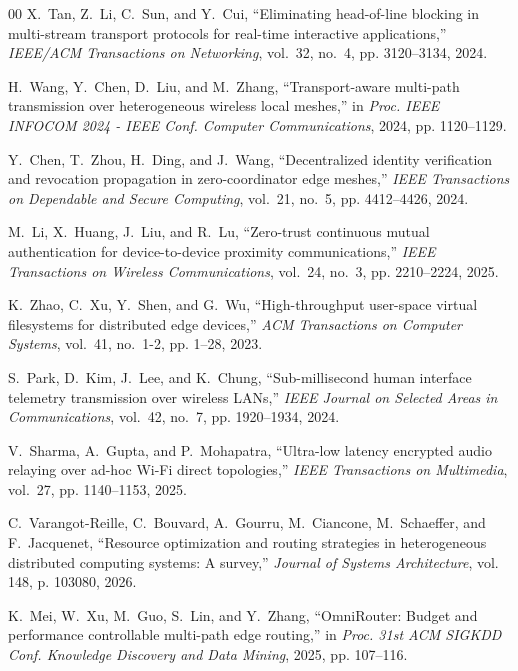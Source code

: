 \documentclass[conference]{IEEEtran}
\begin{document}
\begin{thebibliography}{00}
X.~Tan, Z.~Li, C.~Sun, and Y.~Cui, ``Eliminating head-of-line blocking in multi-stream transport protocols for real-time interactive applications,'' \emph{IEEE/ACM Transactions on Networking}, vol.~32, no.~4, pp. 3120--3134, 2024.

H.~Wang, Y.~Chen, D.~Liu, and M.~Zhang, ``Transport-aware multi-path transmission over heterogeneous wireless local meshes,'' in \emph{Proc. IEEE INFOCOM 2024 - IEEE Conf. Computer Communications}, 2024, pp. 1120--1129.

Y.~Chen, T.~Zhou, H.~Ding, and J.~Wang, ``Decentralized identity verification and revocation propagation in zero-coordinator edge meshes,'' \emph{IEEE Transactions on Dependable and Secure Computing}, vol.~21, no.~5, pp. 4412--4426, 2024.

M.~Li, X.~Huang, J.~Liu, and R.~Lu, ``Zero-trust continuous mutual authentication for device-to-device proximity communications,'' \emph{IEEE Transactions on Wireless Communications}, vol.~24, no.~3, pp. 2210--2224, 2025.

K.~Zhao, C.~Xu, Y.~Shen, and G.~Wu, ``High-throughput user-space virtual filesystems for distributed edge devices,'' \emph{ACM Transactions on Computer Systems}, vol.~41, no.~1-2, pp. 1--28, 2023.

S.~Park, D.~Kim, J.~Lee, and K.~Chung, ``Sub-millisecond human interface telemetry transmission over wireless LANs,'' \emph{IEEE Journal on Selected Areas in Communications}, vol.~42, no.~7, pp. 1920--1934, 2024.

V.~Sharma, A.~Gupta, and P.~Mohapatra, ``Ultra-low latency encrypted audio relaying over ad-hoc Wi-Fi direct topologies,'' \emph{IEEE Transactions on Multimedia}, vol.~27, pp. 1140--1153, 2025.

C.~Varangot-Reille, C.~Bouvard, A.~Gourru, M.~Ciancone, M.~Schaeffer, and F.~Jacquenet, ``Resource optimization and routing strategies in heterogeneous distributed computing systems: A survey,'' \emph{Journal of Systems Architecture}, vol. 148, p. 103080, 2026.

K.~Mei, W.~Xu, M.~Guo, S.~Lin, and Y.~Zhang, ``OmniRouter: Budget and performance controllable multi-path edge routing,'' in \emph{Proc. 31st ACM SIGKDD Conf. Knowledge Discovery and Data Mining}, 2025, pp. 107--116.


\end{thebibliography}
\end{document}
